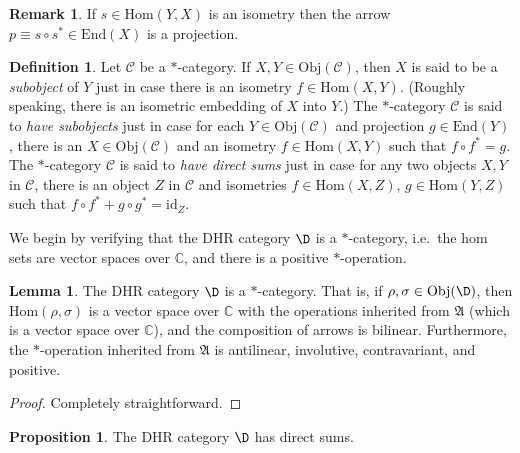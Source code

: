 \documentclass[11pt]{article}
\newcommand{\alg}[1]{\mathfrak{#1}}
\theoremstyle{definition}
\newtheorem{prop}[thm]{Proposition}
\newtheorem{lemma}[thm]{Lemma}
\theoremstyle{definition}
\newtheorem{defn}[thm]{Definition}
\newtheorem{note}[thm]{Remark}
\theoremstyle{remark}
\newcommand{\Obj}{\mathrm{Obj}}
\def\2#1{{\mathcal #1}}
\def\7#1{{\mathbb #1}}
\newcommand{\Hom}{\mathrm{Hom}}
\newcommand{\End}{\mathrm{End}}
\def\id{\mathrm{id}}
\begin{document}
\begin{note} If $s \in \Hom (Y,X)$ is an isometry then
  the arrow $p\equiv s\circ s^*\in \End (X)$ is a
  projection. \end{note}

\begin{defn} Let $\2C$ be a $*$-category.  If $X,Y\in
  \Obj (\2C )$, then $X$ is said to be a
  \emph{subobject} of $Y$ just in case there is an
  isometry $f\in \Hom (X,Y)$.  (Roughly speaking, there
  is an isometric embedding of $X$ into $Y$.)  The
  $*$-category $\2C$ is said to \emph{have subobjects}
  just in case for each $Y\in \Obj (\2C )$ and
  projection $g\in \End (Y)$, there is an $X\in \Obj
  (\2C )$ and an isometry $f\in \Hom (X,Y)$ such that
  $f\circ f^*=g$. The $*$-category $\2C$ is said to
  \emph{have direct sums} just in case for any two
  objects $X,Y$ in $\2C$, there is an object $Z$ in
  $\2C$ and isometries $f\in \Hom (X,Z)$, $g\in \Hom
  (Y,Z)$ such that $f\circ f^*+g\circ g^*=\id _Z$.
\end{defn}

We begin by verifying that the DHR category $\D$ is a $*$-category, i.e.\ the hom
sets are vector spaces over $\7C$, and there is a positive $*$-operation.

\begin{lemma} The DHR category $\D$ is a $*$-category.  That is, if $\rho ,\sigma \in
  \Obj (\D )$, then $\Hom (\rho ,\sigma )$ is a vector space over $\7C$ with the
  operations inherited from $\alg{A}$ (which is a vector space over $\7C$), and the
  composition of arrows is bilinear.  Furthermore, the $*$-operation inherited from
  $\alg{A}$ is antilinear, involutive, contravariant, and positive.
\end{lemma}

\begin{proof} Completely straightforward.  \end{proof}


\begin{prop} The DHR category $\D$ has direct sums.  \end{prop}
\end{document}
